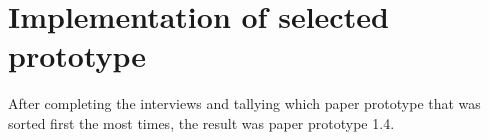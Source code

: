 \documentclass[nofilelist,dvipsnames]{cslthse-msc}
\begin{document}
{%
%
%
%
%

    \section{Implementation of selected prototype}

      After completing the interviews and tallying which paper prototype that
      was sorted first the most times, the result was paper prototype 1.4.



}
\end{document}
